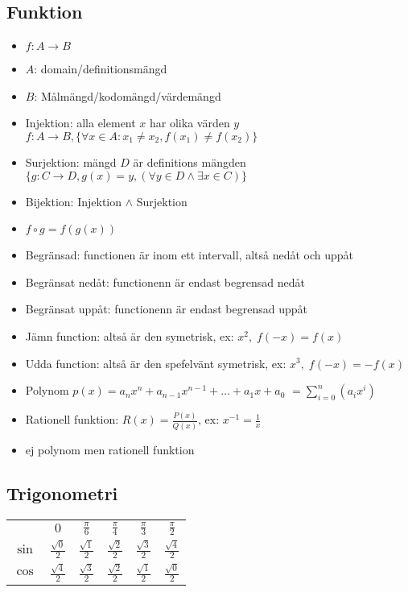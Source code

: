 \begin{multicols}{2}
\subsection{Funktion}
\begin{itemize}
  \item $f: A \to B$ \\
  \item $A$: domain/definitionsmängd \\
  \item $B$: Målmängd/kodomängd/värdemängd \\
  \item Injektion: alla element $x$ har olika värden $y$
  $f: A \to B, \{{\forall x \in A: x_1 \neq x_2, f(x_1) \neq f(x_2)}\}$
  \item Surjektion: mängd $D$ är definitions mängden
  $\{g: C \to D, g(x)=y, (\forall y \in D \land \exists x \in C)\}$
  \item Bijektion: Injektion $\land$ Surjektion
  \item $f \circ g = f(g(x))$
  \item Begränsad: functionen är inom ett intervall, altså nedåt och uppåt
  \item Begränsat nedåt: functionenn är endast begrensad nedåt
  \item Begränsat uppåt: functionenn är endast begrensad uppåt
  \item Jämn function: altså är den symetrisk, ex: $x^2, \; f(-x)=f(x)$
  \item Udda function: altså är den spefelvänt symetrisk, ex: $x^3, \; f(-x)=-f(x)$
  \item Polynom $p(x)=a_nx^n +a_{n-1}x^{n-1}+ \ldots +a_1x +a_0$
  $= \displaystyle\sum _ { i=0 } ^ { n } (a_i x^{i})$
  \item Rationell funktion: $R(x)=\frac{P(x)}{Q(x)} \text{, ex: } x^{-1} =\frac{1}{x}$
  \item ej polynom men rationell funktion
\end{itemize}
\end{multicols}
\raggedcolumns



\newpage

\subsection{Trigonometri}
\begin{center}
\begin{tabular}{ |c|c|c|c|c|c| } 
 \hline
        & $0$                  & $\frac{\pi}{6}$      & $\frac{\pi}{4}$      & $\frac{\pi}{3}$    & $\frac{\pi}{2}$ \\ 
 $\sin$ & $\frac{\sqrt{0}}{2}$ & $\frac{\sqrt{1}}{2}$ & $\frac{\sqrt{2}}{2}$ & $\frac{\sqrt{3}}{2}$ & $\frac{\sqrt{4}}{2}$ \\ 
 $\cos$ & $\frac{\sqrt{4}}{2}$ & $\frac{\sqrt{3}}{2}$ & $\frac{\sqrt{2}}{2}$ & $\frac{\sqrt{1}}{2}$ & $\frac{\sqrt{0}}{2}$ \\  
 \hline
\end{tabular}
\end{center}


